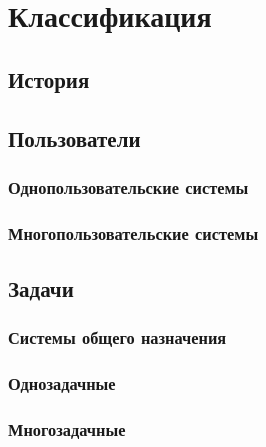 \section{Классификация}\label{base:os:classification}
\subsection{История}\label{base:os:classification:history}
\subsection{Пользователи}\label{base:os:classification:users}
\subsubsection{Однопользовательские системы}\label{base:os:classification:users:singleuser}
\subsubsection{Многопользовательские системы}\label{base:os:classification:users:multiuser}
\subsection{Задачи}\label{base:os:classification:tasks}
\subsubsection{Системы общего назначения}\label{base:os:classification:tasks:general}
\subsubsection{Однозадачные}\label{base:os:classification:tasks:onetask}
\subsubsection{Многозадачные}\label{base:os:classification:tasks:multitask}
